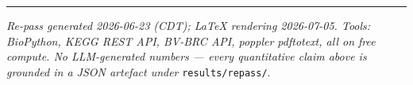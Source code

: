 \documentclass[11pt,letterpaper]{article}
\begin{document}
\vspace{1em}
\hrule
\vspace{0.5em}
\noindent\textit{Re-pass generated 2026-06-23 (CDT); LaTeX rendering 2026-07-05.
Tools: BioPython, KEGG REST API, BV-BRC API, poppler pdftotext, all on free compute.
No LLM-generated numbers --- every quantitative claim above is grounded in a JSON artefact under}
\texttt{results/repass/}.
\end{document}
